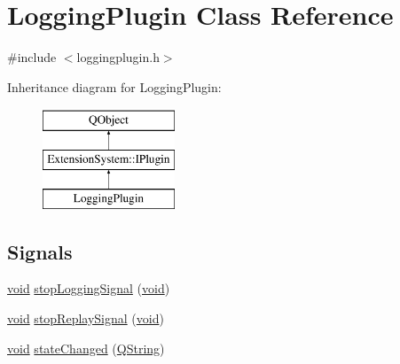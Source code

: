 \hypertarget{class_logging_plugin}{\section{Logging\-Plugin Class Reference}
\label{class_logging_plugin}
}


{\ttfamily \#include $<$loggingplugin.\-h$>$}

Inheritance diagram for Logging\-Plugin\-:\begin{figure}[H]
\begin{center}
\leavevmode
\includegraphics[height=3.000000cm]{class_logging_plugin}
\end{center}
\end{figure}
\subsection*{Signals}
\begin{DoxyCompactItemize}
\item 
\hyperlink{group___u_a_v_objects_plugin_ga444cf2ff3f0ecbe028adce838d373f5c}{void} \hyperlink{class_logging_plugin_a98a1e57b1e2f83725350e1ef0058e99e}{stop\-Logging\-Signal} (\hyperlink{group___u_a_v_objects_plugin_ga444cf2ff3f0ecbe028adce838d373f5c}{void})
\item 
\hyperlink{group___u_a_v_objects_plugin_ga444cf2ff3f0ecbe028adce838d373f5c}{void} \hyperlink{class_logging_plugin_ae099cf3698d490ea9b3484f0fa9ce339}{stop\-Replay\-Signal} (\hyperlink{group___u_a_v_objects_plugin_ga444cf2ff3f0ecbe028adce838d373f5c}{void})
\item 
\hyperlink{group___u_a_v_objects_plugin_ga444cf2ff3f0ecbe028adce838d373f5c}{void} \hyperlink{class_logging_plugin_a48a1e9450ef2427e4b0da0d6566cc711}{state\-Changed} (\hyperlink{group___u_a_v_objects_plugin_gab9d252f49c333c94a72f97ce3105a32d}{Q\-String})
\end{DoxyCompactItemize}
